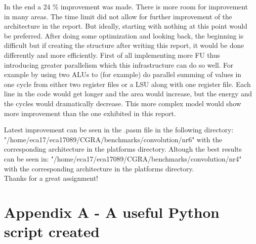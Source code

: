\documentclass[10pt]{IEEEtran}
\begin{document}
In the end a 24 \% improvement was made. There is more room for improvement in many areas. The time limit did not allow for further improvement of the architecture in the report. But ideally, starting with nothing at this point would be preferred. After doing some optimization and looking back, the beginning is difficult but if creating the structure after writing this report, it would be done differently and more efficiently. First of all implementing more FU thus introducing greater parallelism which this infrastructure can do so well. For example by using two ALUs to (for example) do parallel summing of values in one cycle from either two register files or a LSU along with one register file. Each line in the code would get longer and the area would increase, but the energy and the cycles would dramatically decrease. This more complex model would show more improvement than the one exhibited in this report. 

Latest improvement can be seen in the .pasm file in the following directory: 
"/home/eca17/eca17089/CGRA/benchmarks/convolution/nr6" with the corresponding architecture in the platforms directory. Altough the best results can be seen in:
"/home/eca17/eca17089/CGRA/benchmarks/convolution/nr4" with the corresponding architecture in the platforms directory.
\\
Thanks for a great assignment!

\section*{Appendix A - A useful Python script created}
\end{document}
